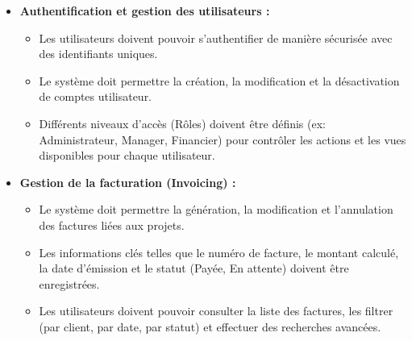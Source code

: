 \documentclass[12pt, a4paper, openany]{report}
\begin{document}
\begin{itemize}
    \renewcommand{\labelitemi}{\textcolor{primaryBlue}{\textbf{\large \ding{118}}}} 
    \setlength{\itemsep}{0.5cm} %

    \item \textcolor{primaryBlue}{\textbf{Authentification et gestion des utilisateurs :}}
    \begin{itemize}
        \renewcommand{\labelitemii}{\textcolor{royalBlue}{\textbullet}}
        \setlength{\itemsep}{0.2cm}
        \vspace{0.2cm}
        
        \vspace{-0.3cm}
        \item Les utilisateurs doivent pouvoir s'authentifier de manière sécurisée avec des identifiants uniques.
        \vspace{-0.3cm}
        \item Le système doit permettre la création, la modification et la désactivation de comptes utilisateur.
        \vspace{-0.3cm}
        \item Différents niveaux d'accès (Rôles) doivent être définis (ex: Administrateur, Manager, Financier) pour contrôler les actions et les vues disponibles pour chaque utilisateur.
    \end{itemize}

    \vspace{-0.4cm}
    \item \textcolor{primaryBlue}{\textbf{Gestion de la facturation (Invoicing) :}}
    \begin{itemize}
        \renewcommand{\labelitemii}{\textcolor{royalBlue}{\textbullet}}
        \setlength{\itemsep}{0.2cm}
        \vspace{0.2cm}
        
        \vspace{-0.3cm}
        \item Le système doit permettre la génération, la modification et l'annulation des factures liées aux projets.
        \vspace{-0.3cm}
        \item Les informations clés telles que le numéro de facture, le montant calculé, la date d'émission et le statut (Payée, En attente) doivent être enregistrées.
        \vspace{-0.3cm}
        \item Les utilisateurs doivent pouvoir consulter la liste des factures, les filtrer (par client, par date, par statut) et effectuer des recherches avancées.
    \end{itemize}


\end{itemize}
\end{document}
